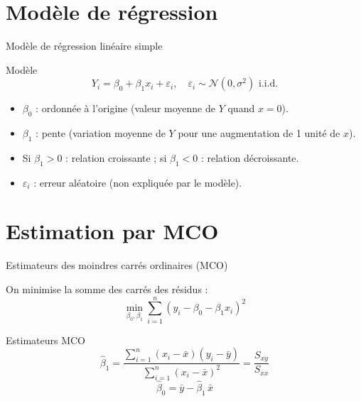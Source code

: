 \documentclass{BeamerTemplate}
\begin{document}
\section{Modèle de régression}

\begin{frame}[t]{Modèle de régression linéaire simple}

\begin{Boite}{Modèle}
$$Y_i = \beta_0 + \beta_1 x_i + \varepsilon_i, \quad \varepsilon_i \sim \mathcal{N}(0, \sigma^2) \text{ i.i.d.}$$
\end{Boite}

\begin{itemize}\itemsep4mm
  \item $\beta_0$ : \alert{ordonnée à l'origine} (valeur moyenne de $Y$ quand $x=0$).
  \item $\beta_1$ : \alert{pente} (variation moyenne de $Y$ pour une augmentation de 1 unité de $x$).
  \item Si $\beta_1 > 0$ : relation croissante ; si $\beta_1 < 0$ : relation décroissante.
  \item $\varepsilon_i$ : erreur aléatoire (non expliquée par le modèle).
\end{itemize}

\end{frame}

\section{Estimation par MCO}

\begin{frame}[t]{Estimateurs des moindres carrés ordinaires (MCO)}

On minimise la somme des carrés des résidus :
$$\min_{\beta_0,\beta_1} \sum_{i=1}^n (y_i - \beta_0 - \beta_1 x_i)^2$$

\begin{Boite}{Estimateurs MCO}
$$\hat{\beta}_1 = \frac{\displaystyle\sum_{i=1}^n (x_i-\bar{x})(y_i-\bar{y})}{\displaystyle\sum_{i=1}^n (x_i-\bar{x})^2} = \frac{S_{xy}}{S_{xx}}$$
$$\hat{\beta}_0 = \bar{y} - \hat{\beta}_1\, \bar{x}$$
\end{Boite}

\end{frame}
\end{document}
